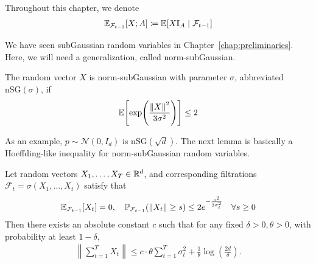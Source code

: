Throughout this chapter, we denote
\begin{align*}
    \mathbb{E}_{\mathcal F_{t-1}}\qty[X ; A] \coloneqq \mathbb{E}\qty[X \mathbb I_A \;\middle|\; \mathcal F_{t-1}]
\end{align*}

We have seen subGaussian random variables in Chapter~\ref{chap:preliminaries}. Here, we will need a generalization, called norm-subGaussian.
\begin{definition}
    The random vector $X$ is norm-subGaussian with parameter $\sigma$, abbreviated $\mathrm{nSG}(\sigma)$, if
    \begin{align*}
        \mathbb{E}\qty[\exp(\frac{\left\lVert X \right\rVert^2}{3\sigma^2})] \leq 2
    \end{align*}
\end{definition}
As an example, $p \sim \mathcal N(0,I_d)$ is $\mathrm{nSG}(\sqrt d)$. The next lemma is basically a Hoeffding-like inequality for norm-subGaussian random variables. 
\begin{lemma}\label{lem:nsg-hoeffding}
    Let random vectors $X_1, \ldots, X_T \in \mathbb{R}^d$, and corresponding filtrations $\mathcal F_t = \sigma(X_1, \ldots, X_t)$ satisfy that 
    \begin{align*}
        \mathbb{E}_{\mathcal F_{t-1}}\qty[X_t] = 0, \quad \mathbb{P}_{\mathcal F_{t-1}}\qty(\left\lVert X_t \right\rVert \geq s) \leq 2e^{-\frac{s^2}{3\sigma_t^2}} \quad \forall s \geq 0
    \end{align*}
    Then there exists an absolute constant $c$ such that for any fixed $\delta > 0, \theta > 0$, with probability at least $1-\delta$,
    \begin{align*}
        \left\|\sum_{t=1}^T X_t\right\| \leq c\cdot \theta \sum_{t=1}^T \sigma_t^2 + \frac{1}{\theta} \log(\frac{2d}{\delta}).
    \end{align*}
\end{lemma}

